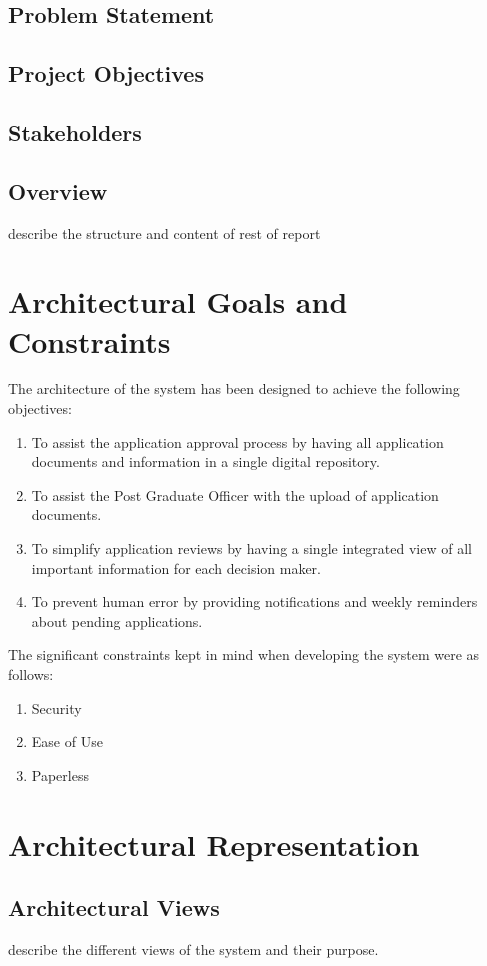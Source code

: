 \documentclass[11pt]{article}
\begin{document}
\subsection{Problem Statement}
\subsection{Project Objectives}
\subsection{Stakeholders}
\subsection{Overview}
describe the structure and content of rest of report
\section{Architectural Goals and Constraints}
The architecture of the system has been designed to achieve the following objectives:
\begin{enumerate}
	\item To assist the application approval process by having all application documents and information in a single digital repository.
	\item To assist the Post Graduate Officer with the upload of application documents.
	\item To simplify application reviews by having a single integrated view of all important information for each decision maker.
	\item To prevent human error by providing notifications and weekly reminders about pending applications.
	
\end{enumerate}

The significant constraints kept in mind when developing the system were as follows:

\begin{enumerate}
	\item Security
	\item Ease of Use
	\item Paperless
\end{enumerate}
\section{Architectural Representation}
\subsection{Architectural Views}
describe the different views of the system and their purpose.
\end{document}
